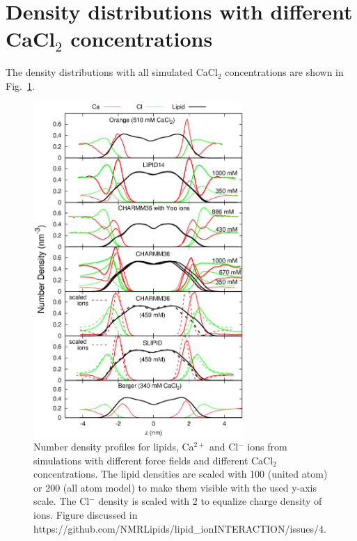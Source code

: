 \documentclass[twoside,twocolumn,9pt]{article}
\begin{document}
\section{Density distributions with different CaCl$_2$ concentrations}

The density distributions with all simulated CaCl$_2$ concentrations are shown in Fig.~\ref{CAdensities}.
\begin{figure}[]
  \centering
  \includegraphics[width=8cm]{../Fig/CAdensities.eps}
  \caption{\label{CAdensities}
    Number density profiles for lipids, Ca$^{2+}$ and Cl$^-$ ions from simulations with different force fields 
    and different CaCl$_2$ concentrations. 
    The lipid densities are scaled with 100 (united atom) or 200 (all atom model) to make them visible with the used y-axis scale.
    The Cl$^-$ density is scaled with 2 to equalize charge density of ions.
    Figure discussed in https://github.com/NMRLipids/lipid\_ionINTERACTION/issues/4.
  }
\end{figure}
\end{document}
